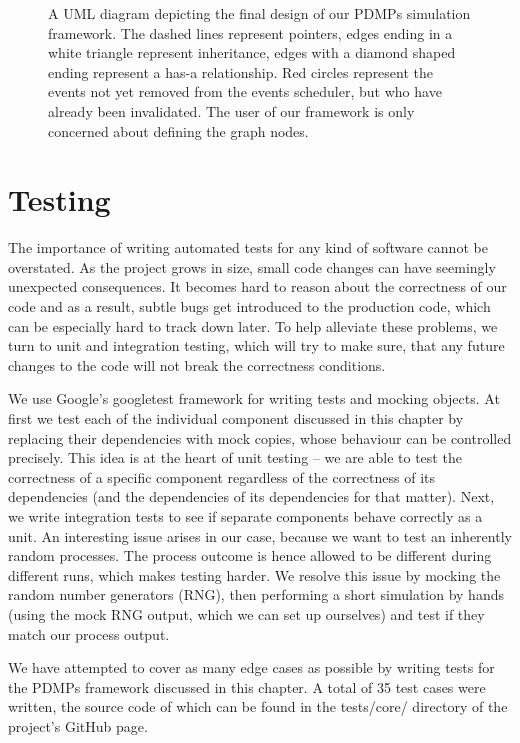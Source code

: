 \documentclass[report.tex]{subfiles}
\begin{document}
\begin{figure}
  \centering
  \def\svgwidth{.95\linewidth}
  
  \caption{A UML diagram depicting the final design of our PDMPs simulation framework.
           The dashed lines represent pointers, edges ending in a white triangle
           represent inheritance, edges with a diamond shaped ending represent a
           has-a relationship. Red circles represent the events not yet removed
           from the events scheduler, but who have already been invalidated.
           The user of our framework is only concerned about defining the graph nodes.}
  \label{image-uml-diagram-dependencies-graph-based-design}
\end{figure}

\section{Testing}

The importance of writing automated tests for any kind of software cannot be overstated.
As the project grows in size, small code changes can have seemingly unexpected consequences.
It becomes hard to reason about the correctness of our code and as a result,
subtle bugs get introduced to the production code, which can be especially hard to
track down later. To help alleviate these problems, we turn to unit and integration testing,
which will try to make sure, that any future changes to the code will not break the
correctness conditions.

We use Google's googletest \cite{googletest-library}
framework for writing tests and mocking objects.
At first we test each of the individual component discussed in this chapter by
replacing their dependencies with mock copies, whose behaviour can be controlled precisely.
This idea is at the heart of unit testing -- we are able to test the correctness of a
specific component regardless of the correctness of its dependencies
(and the dependencies of its dependencies for that matter).
Next, we write integration tests to see if separate components behave correctly as a unit.
An interesting issue arises in our case, because we want to test an inherently random
processes. The process outcome is hence allowed to be different during different
runs, which makes testing harder.
We resolve this issue by mocking the random number generators (RNG), then performing
a short simulation by hands (using the mock RNG output, which we can set up ourselves)
and test if they match our process output.

We have attempted to cover as many edge cases as possible by writing tests
for the PDMPs framework discussed in this chapter. A total of 35 test cases were
written, the source code of which can be found in the tests/core/ directory of the
project's GitHub page.
\end{document}
